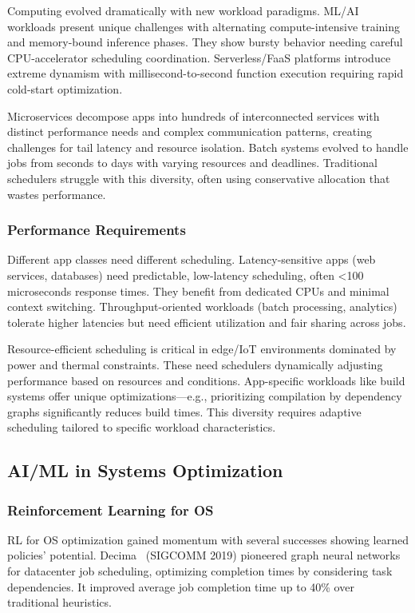 Computing evolved dramatically with new workload paradigms. ML/AI workloads present unique challenges with alternating compute-intensive training and memory-bound inference phases. They show bursty behavior needing careful CPU-accelerator scheduling coordination. Serverless/FaaS platforms introduce extreme dynamism with millisecond-to-second function execution requiring rapid cold-start optimization.

Microservices decompose apps into hundreds of interconnected services with distinct performance needs and complex communication patterns, creating challenges for tail latency and resource isolation. Batch systems evolved to handle jobs from seconds to days with varying resources and deadlines. Traditional schedulers struggle with this diversity, often using conservative allocation that wastes performance.

\subsubsection{Performance Requirements}

Different app classes need different scheduling. Latency-sensitive apps (web services, databases) need predictable, low-latency scheduling, often <100 microseconds response times. They benefit from dedicated CPUs and minimal context switching. Throughput-oriented workloads (batch processing, analytics) tolerate higher latencies but need efficient utilization and fair sharing across jobs.

Resource-efficient scheduling is critical in edge/IoT environments dominated by power and thermal constraints. These need schedulers dynamically adjusting performance based on resources and conditions. App-specific workloads like build systems offer unique optimizations—e.g., prioritizing compilation by dependency graphs significantly reduces build times. This diversity requires adaptive scheduling tailored to specific workload characteristics.

\subsection{AI/ML in Systems Optimization}

\subsubsection{Reinforcement Learning for OS}

RL for OS optimization gained momentum with several successes showing learned policies' potential. Decima~\cite{mao2019decima} (SIGCOMM 2019) pioneered graph neural networks for datacenter job scheduling, optimizing completion times by considering task dependencies. It improved average job completion time up to 40\% over traditional heuristics.

